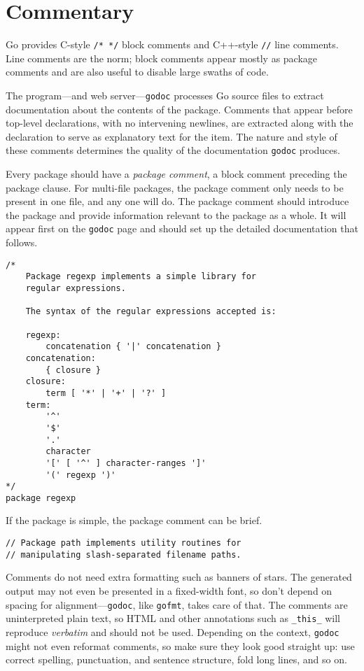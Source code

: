 \section*{Commentary}

Go provides C-style \texttt{/* */} block comments and C++-style
\texttt{//} line comments. Line comments are the norm; block comments
appear mostly as package comments and are also useful to disable large
swaths of code.

The program---and web server---\texttt{godoc} processes Go source files
to extract documentation about the contents of the package. Comments
that appear before top-level declarations, with no intervening newlines,
are extracted along with the declaration to serve as explanatory text
for the item. The nature and style of these comments determines the
quality of the documentation \texttt{godoc} produces.

Every package should have a \emph{package comment}, a block comment
preceding the package clause. For multi-file packages, the package
comment only needs to be present in one file, and any one will do. The
package comment should introduce the package and provide information
relevant to the package as a whole. It will appear first on the
\texttt{godoc} page and should set up the detailed documentation that
follows.

\begin{Verbatim}[frame=single]
/*
    Package regexp implements a simple library for
    regular expressions.

    The syntax of the regular expressions accepted is:

    regexp:
        concatenation { '|' concatenation }
    concatenation:
        { closure }
    closure:
        term [ '*' | '+' | '?' ]
    term:
        '^'
        '$'
        '.'
        character
        '[' [ '^' ] character-ranges ']'
        '(' regexp ')'
*/
package regexp
\end{Verbatim}

If the package is simple, the package comment can be brief.

\begin{Verbatim}[frame=single]
// Package path implements utility routines for
// manipulating slash-separated filename paths.
\end{Verbatim}

Comments do not need extra formatting such as banners of stars. The
generated output may not even be presented in a fixed-width font, so
don't depend on spacing for alignment---\texttt{godoc}, like
\texttt{gofmt}, takes care of that. The comments are uninterpreted plain
text, so HTML and other annotations such as \texttt{\_this\_} will
reproduce \emph{verbatim} and should not be used. Depending on the
context, \texttt{godoc} might not even reformat comments, so make sure
they look good straight up: use correct spelling, punctuation, and
sentence structure, fold long lines, and so on.

